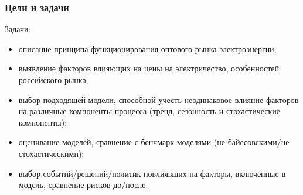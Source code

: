 \documentclass[c, dvipsnames]{beamer}  %
\begin{document}
\begin{frame}[shrink=3]
\frametitle{Цели и задачи} 







\begin{block}{Задачи:}


	\begin{itemize}
		\item  описание принципа функционирования оптового рынка электроэнергии;
		
		\item  выявление факторов  влияющих на цены на электричество, особенностей российского рынка; 
		
		
		

				  
		\item  выбор подходящей модели, способной учесть неодинаковое    влияние факторов на различные компоненты процесса (тренд, сезонность и стохастические компоненты);
		  
 
		\item  оценивание моделей, сравнение с бенчмарк-моделями (не байесовскими/не стохастическими);
		
		\item  выбор событий/решений/политик повлиявших на факторы, включенные в модель, сравнение рисков до/после. 


\end{itemize}
\end{block}
\end{frame}
\end{document}
